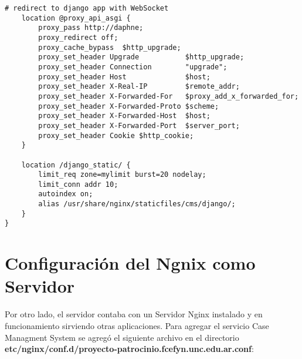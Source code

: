 \begin{lstlisting}[caption={Configuración de Nginx Reverse Proxy}, label={cod:nginx}, captionpos=b]
    # redirect to django app with WebSocket
    location @proxy_api_asgi {
        proxy_pass http://daphne;
        proxy_redirect off;
        proxy_cache_bypass  $http_upgrade;
        proxy_set_header Upgrade           $http_upgrade;
        proxy_set_header Connection        "upgrade";
        proxy_set_header Host              $host;
        proxy_set_header X-Real-IP         $remote_addr;
        proxy_set_header X-Forwarded-For   $proxy_add_x_forwarded_for;
        proxy_set_header X-Forwarded-Proto $scheme;
        proxy_set_header X-Forwarded-Host  $host;
        proxy_set_header X-Forwarded-Port  $server_port;
        proxy_set_header Cookie $http_cookie;
    }

    location /django_static/ {
        limit_req zone=mylimit burst=20 nodelay;
        limit_conn addr 10;
        autoindex on;
        alias /usr/share/nginx/staticfiles/cms/django/;
    }
}
\end{lstlisting}







\section{Configuración del Ngnix como Servidor}

Por otro lado, el servidor contaba con un Servidor Nginx instalado y en funcionamiento sirviendo otras aplicaciones.
Para agregar el servicio Case Managment System se agregó el siguiente archivo en el directorio \textbf{etc/nginx/conf.d/proyecto-patrocinio.fcefyn.unc.edu.ar.conf}:



